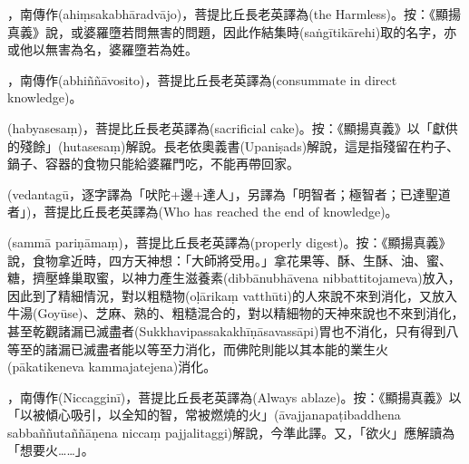 \startitemgroup[noteitems]
\item{}，南傳作(ahiṃsakabhāradvājo)，菩提比丘長老英譯為(the Harmless)。按：《顯揚真義》說，或婆羅墮若問無害的問題，因此作結集時(saṅgītikārehi)取的名字，亦或他以無害為名，婆羅墮若為姓。
\stopitemgroup

\startitemgroup[noteitems]
\item{}，南傳作(abhiññāvosito)，菩提比丘長老英譯為(consummate in direct knowledge)。
\stopitemgroup

\startitemgroup[noteitems]
\item{}(habyasesaṃ)，菩提比丘長老英譯為(sacrificial cake)。按：《顯揚真義》以「獻供的殘餘」(hutasesaṃ)解說。長老依奧義書(Upaniṣads)解說，這是指殘留在杓子、鍋子、容器的食物只能給婆羅門吃，不能再帶回家。
\stopitemgroup

\startitemgroup[noteitems]
\item{}(vedantagū，逐字譯為「吠陀+邊+達人」，另譯為「明智者；極智者；已達聖道者」)，菩提比丘長老英譯為(Who has reached the end of knowledge)。
\stopitemgroup

\startitemgroup[noteitems]
\item{}(sammā pariṇāmaṃ)，菩提比丘長老英譯為(properly digest)。按：《顯揚真義》說，食物拿近時，四方天神想：「大師將受用。」拿花果等、酥、生酥、油、蜜、糖，擠壓蜂巢取蜜，以神力產生滋養素(dibbānubhāvena nibbattitojameva)放入，因此到了精細情況，對以粗糙物(oḷārikaṃ vatthūti)的人來說不來到消化，又放入牛湯(Goyūse)、芝麻、熟的、粗糙混合的，對以精細物的天神來說也不來到消化，甚至乾觀諸漏已滅盡者(Sukkhavipassakakhīṇāsavassāpi)胃也不消化，只有得到八等至的諸漏已滅盡者能以等至力消化，而佛陀則能以其本能的業生火(pākatikeneva kammajatejena)消化。
\stopitemgroup

\startitemgroup[noteitems]
\item{}，南傳作(Niccagginī)，菩提比丘長老英譯為(Always ablaze)。按：《顯揚真義》以「以被傾心吸引，以全知的智，常被燃燒的火」(āvajjanapaṭibaddhena sabbaññutaññāṇena niccaṃ pajjalitaggi)解說，今準此譯。又，「欲火」應解讀為「想要火……」。
\stopitemgroup

